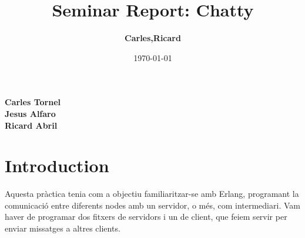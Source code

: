 \documentclass[a4paper, 10pt]{article}
\title{Seminar Report: Chatty}
\author{\textbf{Carles,Ricard}}
\date{\normalsize\today{}}
\begin{document}
\maketitle

\begin{center}
  \textbf{Carles Tornel}\\
  \textbf{Jesus Alfaro}\\
  \textbf{Ricard Abril}

\end{center}

\section{Introduction}

Aquesta pràctica tenia com a objectiu familiaritzar-se amb Erlang, programant la comunicació entre diferents nodes amb un servidor, o més, com intermediari. Vam haver de programar dos fitxers de servidors i un de client, que feiem servir per enviar missatges a altres clients.

\newpage
\end{document}
